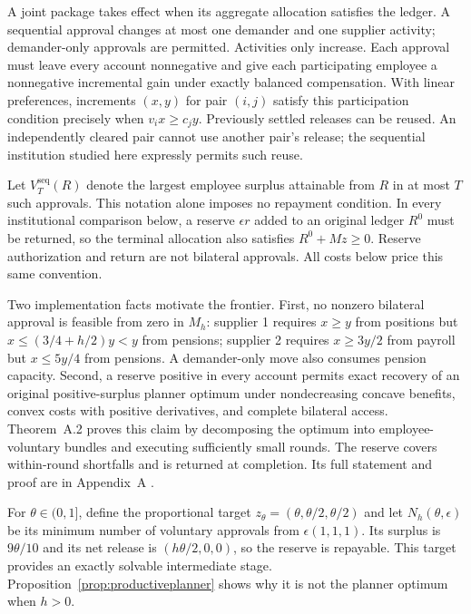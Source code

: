 \documentclass[ecta,draft]{econsocart}
\theoremstyle{definition}
\theoremstyle{definition}
\begin{document}
A joint package takes effect when its aggregate allocation satisfies the ledger.
A sequential approval changes at most one demander and one supplier activity;
demander-only approvals are permitted. Activities only increase. Each approval
must leave every account nonnegative and give each participating employee a
nonnegative incremental gain under exactly balanced compensation. With linear
preferences, increments $(x,y)$ for pair $(i,j)$ satisfy this participation
condition precisely when $v_ix\geq c_jy$. Previously settled releases can be
reused. An independently cleared pair cannot use another pair's release; the
sequential institution studied here expressly permits such reuse.

Let $V_T^{\mathrm{seq}}(R)$ denote the largest employee surplus attainable
from $R$ in at most $T$ such approvals. This notation alone imposes no repayment
condition. In every institutional comparison below, a reserve $\epsilon r$
added to an original ledger $R^0$ must be returned, so the terminal allocation
also satisfies $R^0+Mz\geq0$. Reserve authorization and return are not bilateral
approvals. All costs below price this same convention.

Two implementation facts motivate the frontier. First, no nonzero bilateral
approval is feasible from zero in $M_h$: supplier 1 requires $x\geq y$ from
positions but $x\leq(3/4+h/2)y<y$ from pensions; supplier 2 requires
$x\geq3y/2$ from payroll but $x\leq5y/4$ from pensions. A demander-only move
also consumes pension capacity. Second, a reserve positive in every account
permits exact recovery of an original positive-surplus planner optimum under
nondecreasing concave benefits, convex costs with positive derivatives, and
complete bilateral access. Theorem~A.2%
 proves this
claim by decomposing the optimum into employee-voluntary bundles and executing
sufficiently small rounds. The reserve covers within-round shortfalls and is
returned at completion. Its full statement and proof are in
Appendix~A%
.

For $\theta\in(0,1]$, define the proportional target
$z_\theta=(\theta,\theta/2,\theta/2)$ and let
$N_h(\theta,\epsilon)$ be its minimum number of voluntary approvals from
$\epsilon(1,1,1)$. Its surplus is $9\theta/10$ and its net release is
$(h\theta/2,0,0)$, so the reserve is repayable. This target provides an exactly
solvable intermediate stage. Proposition~\ref{prop:productiveplanner} shows
why it is not the planner optimum when $h>0$.
\end{document}
